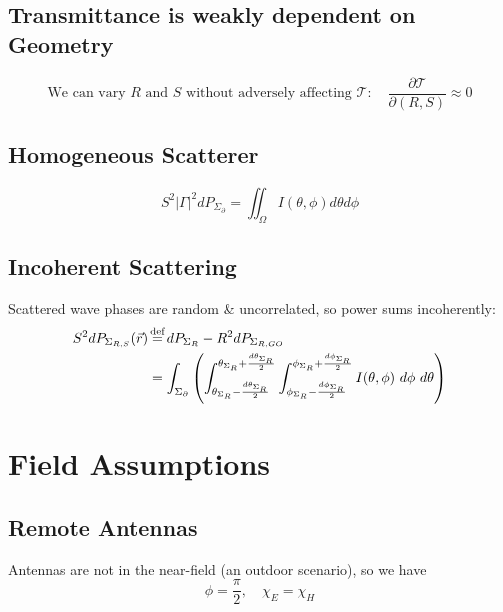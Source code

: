 \documentclass{article}
\begin{document}
\subsection{Transmittance is weakly dependent on Geometry}
\begin{equation}
   \text{We can vary $R$ and $S$ without adversely affecting } \mathcal{T}: \quad \frac{\partial \mathcal{T}}{\partial(R, S)} \approx 0
   \label{eq:transmittanceWeaklyGeometric}
\end{equation}
\subsection{Homogeneous Scatterer}
\begin{equation}
   S^2 |\Gamma|^2 dP_{\Sigma_{\partial}} = \iint_{\Omega} I( \theta, \phi ) d \theta
      d \phi
   \label{eq:homogeneousScatter}
\end{equation}
\subsection{Incoherent Scattering}
Scattered wave phases are random \& uncorrelated, so power sums incoherently: 
\begin{align}
   S^2 dP_{\Sigma_{R, S}} ( \vec{r} ) &\overset{\mathclap{\text{def}}}{=}
      dP_{\Sigma_R} - R^2 dP_{\Sigma_{R, GO}} \nonumber \\
   &= \int_{\Sigma_{\partial}} \left( \int_{\theta_{\Sigma_R} - \frac{d
      \theta_{\Sigma_R}}{2}}^{\theta_{\Sigma_R} + \frac{d \theta_{\Sigma_R}}{2}}
      \int_{\phi_{\Sigma_R} - \frac{d \phi_{\Sigma_R}}{2}}^{\phi_{\Sigma_R} + \frac{d
      \phi_{\Sigma_R}}{2}} I( \theta, \phi ) \ d \phi \ d \theta \right)
   \label{eq:incoherence}
\end{align}

\setcounter{section}{5} %
\setcounter{subsection}{0}
\setcounter{equation}{0}
\section{Field Assumptions}
\subsection{Remote Antennas}
Antennas are not in the near-field (an outdoor scenario), so we have
\begin{equation}
   \phi = \frac{\pi}{2}, \quad \chi_E = \chi_H
   \label{eq:remoteAntennas}
\end{equation}
\end{document}
